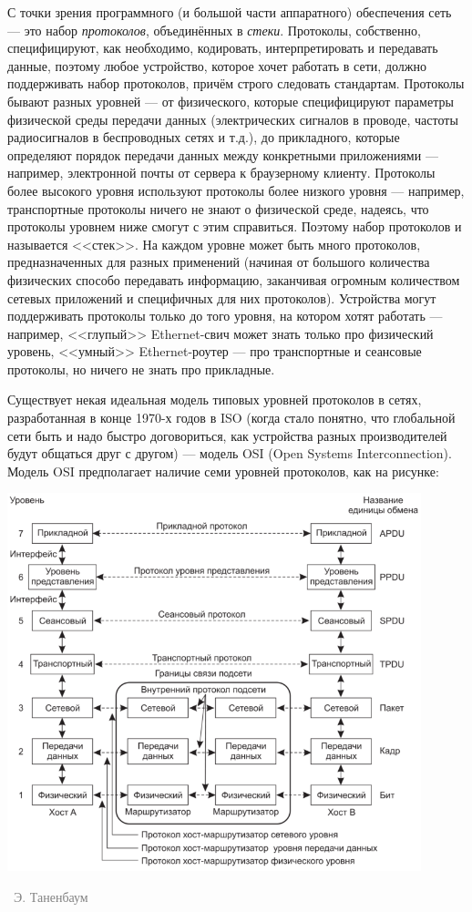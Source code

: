 \documentclass[a5paper]{article}
\newcommand{\attribution}[1] {
\vspace{-5mm}\begin{flushright}\begin{scriptsize}\textcolor{gray}{\textcopyright\, #1}\end{scriptsize}\end{flushright}
}
\begin{document}
С точки зрения программного (и большой части аппаратного) обеспечения сеть --- это набор \textit{протоколов}, объединённых в \textit{стеки}. Протоколы, собственно, специфицируют, как необходимо, кодировать, интерпретировать и передавать данные, поэтому любое устройство, которое хочет работать в сети, должно поддерживать набор протоколов, причём строго следовать стандартам. Протоколы бывают разных уровней --- от физического, которые специфицируют параметры физической среды передачи данных (электрических сигналов в проводе, частоты радиосигналов в беспроводных сетях и т.д.), до прикладного, которые определяют порядок передачи данных между конкретными приложениями --- например, электронной почты от сервера к браузерному клиенту. Протоколы более высокого уровня используют протоколы более низкого уровня --- например, транспортные протоколы ничего не знают о физической среде, надеясь, что протоколы уровнем ниже смогут с этим справиться. Поэтому набор протоколов и называется <<стек>>. На каждом уровне может быть много протоколов, предназначенных для разных применений (начиная от большого количества физических способо передавать информацию, заканчивая огромным количеством сетевых приложений и специфичных для них протоколов). Устройства могут поддерживать протоколы только до того уровня, на котором хотят работать --- например, <<глупый>> Ethernet-свич может знать только про физический уровень, <<умный>> Ethernet-роутер --- про транспортные и сеансовые протоколы, но ничего не знать про прикладные.

Существует некая идеальная модель типовых уровней протоколов в сетях, разработанная в конце 1970-х годов в ISO (когда стало понятно, что глобальной сети быть и надо быстро договориться, как устройства разных производителей будут общаться друг с другом) --- модель OSI (Open Systems Interconnection). Модель OSI предполагает наличие семи уровней протоколов, как на рисунке:

\begin{center}
    \includegraphics[width=0.9\textwidth]{osiStack.png}
    \attribution{Э. Таненбаум}
\end{center}
\end{document}
